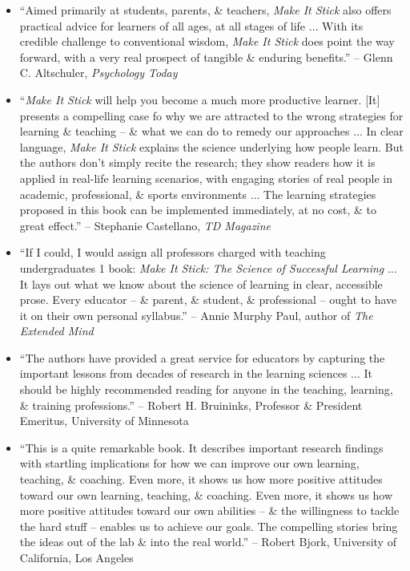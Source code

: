 \documentclass{article}
\begin{document}
\begin{enumerate}
\begin{itemize}
		\item ``Aimed primarily at students, parents, \& teachers, {\it Make It Stick} also offers practical advice for learners of all ages, at all stages of life $\ldots$ With its credible challenge to conventional wisdom, {\it Make It Stick} does point the way forward, with a very real prospect of tangible \& enduring benefits.'' -- {\sc Glenn C. Altschuler}, {\it Psychology Today}
		\item ``{\it Make It Stick} will help you become a much more productive learner. [It] presents a compelling case fo why we are attracted to the wrong strategies for learning \& teaching -- \& what we can do to remedy our approaches $\ldots$ In clear language, {\it Make It Stick} explains the science underlying how people learn. But the authors don't simply recite the research; they show readers how it is applied in real-life learning scenarios, with engaging stories of real people in academic, professional, \& sports environments $\ldots$ The learning strategies proposed in this book can be implemented immediately, at no cost, \& to great effect.'' -- {\sc Stephanie Castellano}, {\it TD Magazine}
		\item ``If I could, I would assign all professors charged with teaching undergraduates 1 book: {\it Make It Stick: The Science of Successful Learning} $\ldots$ It lays out what we know about the science of learning in clear, accessible prose. Every educator -- \& parent, \& student, \& professional -- ought to have it on their own personal syllabus.'' -- {\sc Annie Murphy Paul}, author of {\it The Extended Mind}
		\item ``The authors have provided a great service for educators by capturing the important lessons from decades of research in the learning sciences $\ldots$ It should be highly recommended reading for anyone in the teaching, learning, \& training professions.'' -- {\sc Robert H. Bruininks}, Professor \& President Emeritus, University of Minnesota
		\item ``This is a quite remarkable book. It describes important research findings with startling implications for how we can improve our own learning, teaching, \& coaching. Even more, it shows us how more positive attitudes toward our own learning, teaching, \& coaching. Even more, it shows us how more positive attitudes toward our own abilities -- \& the willingness to tackle the hard stuff -- enables us to achieve our goals. The compelling stories bring the ideas out of the lab \& into the real world.'' -- {\sc Robert Bjork}, University of California, Los Angeles

\end{itemize}
\end{enumerate}
\end{document}
